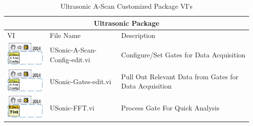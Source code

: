 \documentclass[11pt,a4paper,oldfontcommands]{memoir}
\begin{document}
\begin{table}
	\centering
	\begin{tabular}{ m{2.5cm} | m{5cm} | m{5cm} }
		\hline
		\hline \multicolumn{3}{c}{Ultrasonic Package} \\ \hline \hline
		VI & File Name & Description \\ \hline
		\includegraphics[scale=0.625]{USonic-A-Scan-Config-edit_main_01} & USonic-A-Scan-Config-edit.vi & Configure/Set Gates for Data Acquisition \\ \hline
		\includegraphics[scale=0.625]{USonic-A-Scan-Config-edit_main_01} & USonic-Gates-edit.vi & Pull Out Relevant Data from Gates for Data Acquisition \\ \hline
		\includegraphics[scale=0.625]{USonic-FFT_main_01} & USonic-FFT.vi & Process Gate For Quick Analysis \\ \hline
	\end{tabular}
	\caption{Ultrasonic A-Scan Customized Package VI's}
	\label{tab:usonic}
\end{table}
\end{document}
